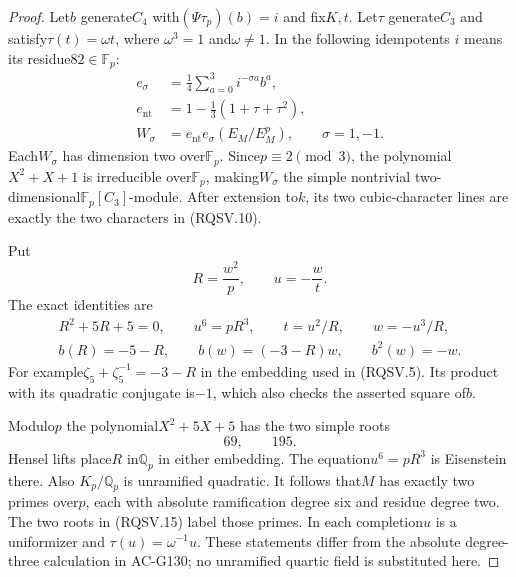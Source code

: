 \begin{proof}
Let$b$ generate$C_4$ with$(\Psi\tau_p)(b)=i$ and fix$K,t$.
Let$\tau$ generate$C_3$ and satisfy$\tau(t)=\omega t$, where
$\omega^3=1$ and$\omega\ne1$.  In the following idempotents
$i$ means its residue$82\in\mathbb F_p$:
\[
 \begin{split}
 e_\sigma&=\frac14\sum_{a=0}^3 i^{-\sigma a}b^a,\\
 e_{\mathrm{nt}}&=1-\frac13(1+\tau+\tau^2),\\
 W_\sigma&=e_{\mathrm{nt}}e_\sigma(E_M/E_M^p),
                           \qquad \sigma=1,-1 .
 \end{split}
 \tag{RQSV.12}
\]
Each$W_\sigma$ has dimension two over$\mathbb F_p$.
Since$p\equiv2\pmod3$, the polynomial$X^2+X+1$ is irreducible
over$\mathbb F_p$, making$W_\sigma$ the simple nontrivial
two-dimensional$\mathbb F_p[C_3]$-module.
After extension to$k$, its two cubic-character lines are exactly
the two characters in (RQSV.10).

Put
\[
             R=\frac{w^2}{p},\qquad u=-\frac wt .
 \tag{RQSV.13}
\]
The exact identities are
\[
 \begin{gathered}
 R^2+5R+5=0,\qquad
 u^6=pR^3,\qquad t=u^2/R,\qquad w=-u^3/R,\\
 b(R)=-5-R,\qquad b(w)=(-3-R)w,\qquad b^2(w)=-w.
 \end{gathered}
 \tag{RQSV.14}
\]
For example$\zeta_5+\zeta_5^{-1}=-3-R$ in the embedding
used in (RQSV.5).  Its product with its quadratic conjugate is$-1$,
which also checks the asserted square of$b$.

Modulo$p$ the polynomial$X^2+5X+5$ has the two simple roots
\[
                               69,\qquad195.
 \tag{RQSV.15}
\]
Hensel lifts place$R$ in$\mathbb Q_p$ in either embedding.
The equation$u^6=pR^3$ is Eisenstein there.  Also
$K_p/\mathbb Q_p$ is unramified quadratic.  It follows that$M$
has exactly two primes over$p$, each with absolute ramification
degree six and residue degree two.  The two roots in (RQSV.15)
label those primes.  In each completion$u$ is a uniformizer and
$\tau(u)=\omega^{-1}u$.
These statements differ from the absolute degree-three calculation
in AC-G130; no unramified quartic field is substituted here.


\end{proof}
